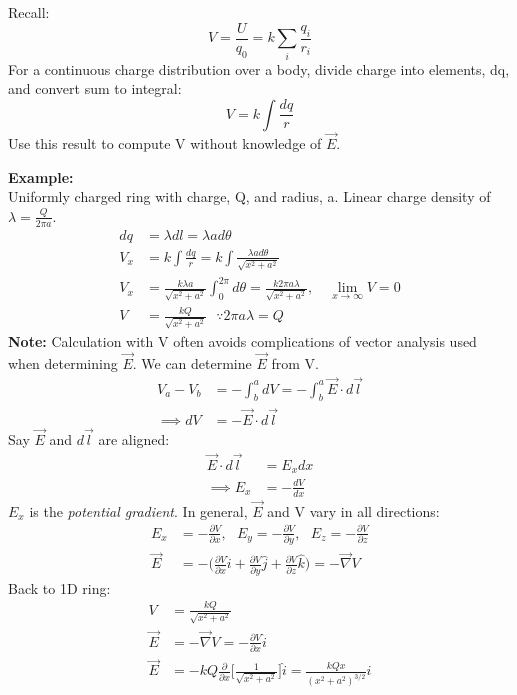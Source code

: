 \documentclass[a4paper, 11pt, normalem]{report}
\begin{document}
\chapter{}
Recall:
\begin{equation}
    V = \frac{U}{q_{0}} = k \sum_{i} \frac{q_{i}}{r_{i}}
\end{equation}
For a continuous charge distribution over a body, divide charge into elements, dq, and convert sum to integral:
\begin{equation}
    V = k \int \frac{dq}{r}
\end{equation}
Use this result to compute V without knowledge of $\vec{E}$.

\textbf{Example:}\\
Uniformly charged ring with charge, Q, and radius, a. 
Linear charge density of $\lambda = \frac{Q}{2\pi a}$.
\begin{align}
    dq &= \lambda dl = \lambda a d\theta \\
    V_{x} &= k \int \frac{dq}{r} = k \int \frac{\lambda a d\theta}{\sqrt{x^{2} + a^{2}}} \\
    V_{x} &= \frac{k\lambda a}{\sqrt{x^{2} + a^{2}}} \int_{0}^{2\pi} d\theta = \frac{k2\pi a \lambda}{\sqrt{x^{2} + a^{2}}},\quad \lim_{x \to \infty} V = 0 \\
    V &= \frac{kQ}{\sqrt{x^{2} + a^{2}}} ~~~ \because 2\pi a \lambda = Q
\end{align}
\textbf{Note:} Calculation with V often avoids complications of vector analysis used when determining $\vec{E}$. We can determine $\vec{E}$ from V.
\begin{align}
    V_{a} - V_{b} &= - \int_{b}^{a} dV = - \int_{b}^{a} \vec{E} \cdot d\vec{l} \\
    \implies dV &= - \vec{E} \cdot d\vec{l}
\end{align}
Say $\vec{E}$ and $d\vec{l}$ are aligned:
\begin{align}
    \vec{E} \cdot d\vec{l} &= E_{x}dx \\
    \implies E_{x} &= - \frac{dV}{dx}
\end{align}
$E_{x}$ is the \emph{potential gradient}.
In general, $\vec{E}$ and V vary in all directions:
\begin{align}
    E_{x} &= - \frac{\partial V}{\partial x}, ~~~ E_{y} = - \frac{\partial V}{\partial y}, ~~~ E_{z} = - \frac{\partial V}{\partial z} \\
    \vec{E} &= - \Bigg(\frac{\partial V}{\partial x} \hat{i} + \frac{\partial V}{\partial y} \hat{j} + \frac{\partial V}{\partial z} \hat{k} \Bigg) = - \vec{\nabla} V
\end{align}
Back to 1D ring:
\begin{align}
    V &= \frac{kQ}{\sqrt{x^{2} + a^{2}}} \\
    \vec{E} &= -\vec{\nabla}V = - \frac{\partial V}{\partial x} \hat{i} \\
    \vec{E} &= -kQ \frac{\partial}{\partial x} \Bigg[\frac{1}{\sqrt{x^{2} + a^{2}}} \Bigg] \hat{i} = \frac{kQx}{(x^{2} + a^{2})^{3/2}} \hat{i}
\end{align}
\end{document}
